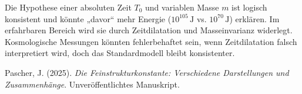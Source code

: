 \documentclass{article}
\begin{document}
	Die Hypothese einer absoluten Zeit \( T_0 \) und variablen Masse \( m \) ist logisch konsistent und könnte „davor“ mehr Energie (\( 10^{105} \, \text{J} \) vs. \( 10^{70} \, \text{J} \)) erklären. Im erfahrbaren Bereich wird sie durch Zeitdilatation und Masseinvarianz widerlegt. Kosmologische Messungen könnten fehlerbehaftet sein, wenn Zeitdilatation falsch interpretiert wird, doch das Standardmodell bleibt konsistenter.
	
	\begin{thebibliography}{1}
		 Pascher, J. (2025). \textit{Die Feinstrukturkonstante: Verschiedene Darstellungen und Zusammenhänge}. Unveröffentlichtes Manuskript.
	\end{thebibliography}
	
\end{document}

